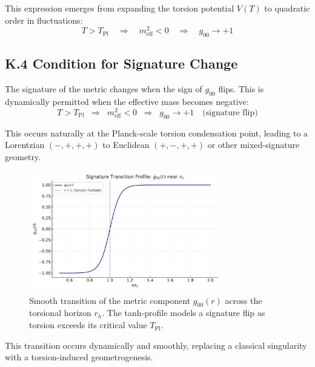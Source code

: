 \documentclass{article}
\begin{document}
This expression emerges from expanding the torsion potential $V(T)$ to quadratic order in fluctuations:
\begin{equation}
T > T_{\mathrm{Pl}} \quad \Rightarrow \quad m_\text{eff}^2 < 0 \quad \Rightarrow \quad g_{00} \to +1
\end{equation}

\subsection*{K.4 Condition for Signature Change}
The signature of the metric changes when the sign of $g_{00}$ flips. This is dynamically permitted when the effective mass becomes negative:
\begin{equation}
\boxed{
T > T_{\mathrm{Pl}} \;\; \Rightarrow \;\; m_{\mathrm{eff}}^2 < 0 \;\; \Rightarrow \;\; g_{00} \rightarrow +1 \quad \text{(signature flip)}
}
\end{equation}

This occurs naturally at the Planck-scale torsion condensation point, leading to a Lorentzian $(-,+,+,+)$ to Euclidean $(+,-,+,+)$ or other mixed-signature geometry.

\begin{figure}[h!]
\centering
\includegraphics[width=0.75\textwidth]{Fig_signature_flip.pdf}
\caption{Smooth transition of the metric component $g_{00}(r)$ across the torsional horizon $r_h$.
The tanh-profile models a signature flip as torsion exceeds its critical value $T_{\mathrm{Pl}}$.}
\label{fig:g00_flip}
\end{figure}


\noindent This transition occurs dynamically and smoothly, replacing a classical singularity with a torsion-induced geometrogenesis.
\end{document}
